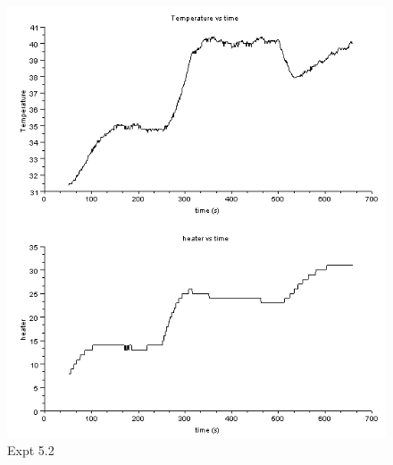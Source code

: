 \begin{figure}[H]
  \includegraphics[]{mpc/5_2_heater_final.png}
  \caption{Expt 5.2}
\end{figure}


